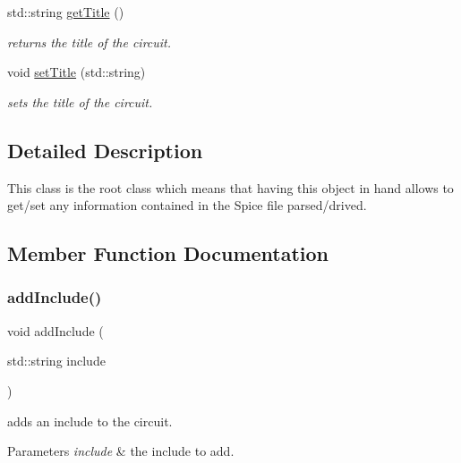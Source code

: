 \begin{DoxyCompactItemize}
\mbox{\label{class_s_p_i_c_e_1_1_circuit_ad19721dd878c04c854a72af12d785741}} 
std\+::string \mbox{\hyperlink{class_s_p_i_c_e_1_1_circuit_ad19721dd878c04c854a72af12d785741}{get\+Title}} ()
\begin{DoxyCompactList}\small\item\em returns the title of the circuit. \end{DoxyCompactList}\item 
void \mbox{\hyperlink{class_s_p_i_c_e_1_1_circuit_a798df9ebd558e22c85eeceb5202e3123}{set\+Title}} (std\+::string)
\begin{DoxyCompactList}\small\item\em sets the title of the circuit. \end{DoxyCompactList}\end{DoxyCompactItemize}


\subsection{Detailed Description}
This class is the root class which means that having this object in hand allows to get/set any information contained in the Spice file parsed/drived. 

\subsection{Member Function Documentation}
\mbox{\label{class_s_p_i_c_e_1_1_circuit_a30fc53c4da54215fdec3ab1b96ea1943}} 
\subsubsection{\texorpdfstring{add\+Include()}{addInclude()}}
{\footnotesize\ttfamily void add\+Include (\begin{DoxyParamCaption}\item[{std\+::string}]{include }\end{DoxyParamCaption})\hspace{0.3cm}{\ttfamily [inline]}}



adds an include to the circuit. 


\begin{DoxyParams}{Parameters}
{\em include} & the include to add. \\
\hline
\end{DoxyParams}
\mbox{\label{class_s_p_i_c_e_1_1_circuit_a7bb4a4532643568ab1ac2c229185a88e}} 
